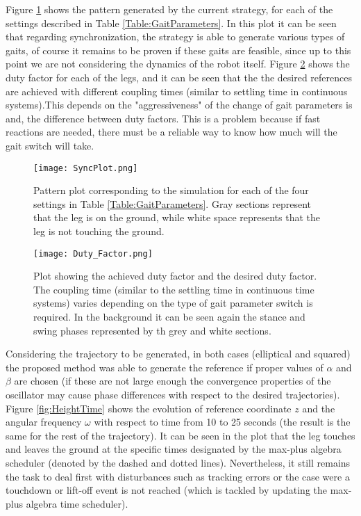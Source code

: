 \documentclass[main.tex]{subfiles}
\begin{document}
Figure \ref{fig:SyncPlot} shows the pattern generated by the current strategy, for each of the settings described in Table \ref{Table:GaitParameters}. In this plot it can be seen that regarding synchronization, the strategy is able to generate various types of gaits, of course it remains to be proven if these gaits are feasible, since up to this point we are not considering the dynamics of the robot itself. Figure \ref{fig:DutyFactor} shows the duty factor for each of the legs, and it can be seen that the the desired references are achieved with different coupling times (similar to settling time in continuous systems).This depends on the "aggressiveness" of the change of gait parameters is and, the difference between duty factors. This is a problem because if fast reactions are needed, there must be a reliable way to know how much will the gait switch will take.
\begin{figure}[t]\centering
		\texttt{[image: SyncPlot.png]}
		\caption{Pattern plot corresponding to the simulation for each of the four settings in Table \ref{Table:GaitParameters}. Gray sections represent that the leg is on the ground, while white space represents that the leg is not touching the ground.
			\label{fig:SyncPlot} }
\end{figure}
\begin{figure}[t]\centering
		\texttt{[image: Duty\_Factor.png]}
		\caption{Plot showing the achieved duty factor and the desired duty factor. The coupling time (similar to the settling time in continuous time systems) varies depending on the type of gait parameter switch is required. In the background it can be seen again the stance and swing phases represented by th grey and white sections.
			\label{fig:DutyFactor} }
\end{figure}

Considering the trajectory to be generated, in both cases (elliptical and squared) the proposed method was able to generate the reference if proper values of $\alpha$ and $\beta$ are chosen (if these are not large enough the convergence properties of the oscillator may cause phase differences with respect to the desired trajectories). Figure \ref{fig:HeightTime} shows the evolution of reference coordinate $z$ and the angular frequency $\omega$ with respect to time from 10 to 25 seconds (the result is the same for the rest of the trajectory). It can be seen in the plot that the leg touches and leaves the ground at the specific times designated by the max-plus algebra scheduler (denoted by the dashed and dotted lines). Nevertheless, it still remains the task to deal first with disturbances such as tracking errors or the case were a touchdown or lift-off event is not reached (which is tackled by updating the max-plus algebra time scheduler).
\end{document}
